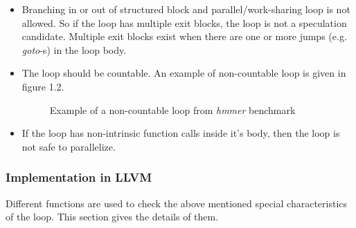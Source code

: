 \documentclass[10pt]{report}          %
\begin{document}
\begin{itemize}

\item Branching in or out of structured block and  parallel/work-sharing loop is not allowed. So if the loop has multiple exit blocks, the loop is not a speculation candidate.  Multiple exit blocks exist when there are one or more jumps (e.g. \textit{goto}-s) in the loop body.

\item The loop should be countable.  An example of non-countable loop is given in figure 1.2. 

\begin{figure}[h]
\label{fig:non_countable}
\begin{center}
\renewcommand{\figure}{Fig.}
\caption{ Example of a non-countable loop from \textit{hmmer} benchmark}
\end{center}
\end{figure}

\item If the loop has non-intrinsic function calls inside it's body, then the loop is not safe to parallelize.

\end{itemize}

\subsubsection{Implementation in LLVM}
\label{LLVMImplementation}
Different functions are used to check the above mentioned special characteristics of the loop.  This section gives the details of them.
\end{document}
